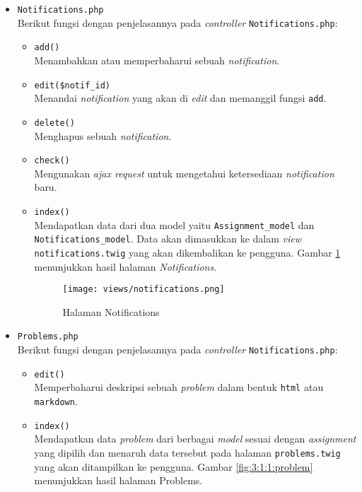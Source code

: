 \begin{itemize}
\begin{itemize}
	      \end{itemize}

	\item \verb|Notifications.php| \\
	      Berikut fungsi dengan penjelasannya pada \textit{controller} \verb|Notifications.php|:

	      \begin{itemize}
		      \item \verb|add()| \\
		            Menambahkan atau memperbaharui sebuah \textit{notification}.
		      \item \verb|edit($notif_id)| \\
		            Menandai \textit{notification} yang akan di \textit{edit} dan memanggil fungsi \verb|add|.
		      \item \verb|delete()| \\
		            Menghapus sebuah \textit{notification}.
		      \item \verb|check()| \\
		            Mengunakan \textit{ajax request} untuk mengetahui ketersediaan \textit{notification} baru.
		      \item \verb|index()| \\
		            Mendapatkan data dari dua model yaitu \verb|Assignment_model| dan \verb|Notifications_model|. Data akan dimasukkan ke dalam \textit{view} \verb|notifications.twig| yang akan dikembalikan ke pengguna. Gambar \ref{fig:3:1:1:notif} menunjukkan hasil halaman \textit{Notifications}.

		            \begin{figure}[H]
			            \centering
			            \texttt{[image: views/notifications.png]}
			            \caption{Halaman Notifications}
			            \label{fig:3:1:1:notif}
		            \end{figure}

	      \end{itemize}

	\item \verb|Problems.php| \\
	      Berikut fungsi dengan penjelasannya pada \textit{controller} \verb|Notifications.php|:

	      \begin{itemize}
		      \item \verb|edit()| \\
		            Memperbaharui deskripsi sebuah \textit{problem} dalam bentuk \verb|html| atau \verb|markdown|.
		      \item \verb|index()| \\
		            Mendapatkan data \textit{problem} dari berbagai \textit{model} sesuai dengan \textit{assignment} yang dipilih dan menaruh data tersebut pada halaman \verb|problems.twig| yang akan ditampilkan ke pengguna. Gambar \ref{fig:3:1:1:problem} menunjukkan hasil halaman Problems.


\end{itemize}
\end{itemize}
